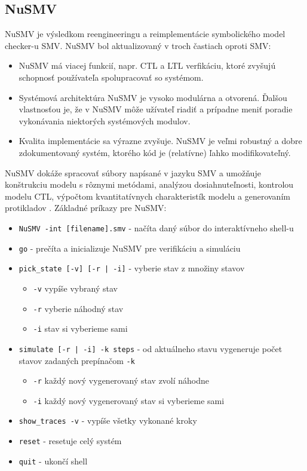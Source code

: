 \subsection{NuSMV}
NuSMV je výsledkom reengineeringu a reimplementácie symbolického model checker-u SMV. NuSMV 
bol aktualizovaný v troch častiach oproti SMV:

\begin{itemize}
    \item NuSMV má viacej funkcií, napr. CTL a LTL verfikáciu, ktoré zvyšujú schopnosť 
    používateľa spolupracovať so systémom.
    \item Systémová architektúra NuSMV je vysoko modulárna a otvorená. Ďalšou vlastnosťou je, 
    že v NuSMV môže užívateľ riadiť a prípadne meniť poradie vykonávania niektorých systémových modulov.
    \item Kvalita implementácie sa výrazne zvyšuje. NuSMV je veľmi robustný a dobre zdokumentovaný systém, 
    ktorého kód je (relatívne) ľahko modifikovateľný.
\end{itemize}

NuSMV dokáže spracovať súbory napísané v jazyku SMV a umožňuje konštrukciu modelu s rôznymi metódami, 
analýzou dosiahnuteľnosti, kontrolou modelu CTL, výpočtom kvantitatívnych charakteristík 
modelu a generovaním protikladov \cite{br8}. Základné príkazy pre NuSMV:

\begin{itemize}
    \item \texttt{NuSMV -int [filename].smv} - načíta daný súbor do interaktívneho shell-u
    \item \texttt{go} - prečíta a inicializuje NuSMV pre verifikáciu a simuláciu
    \item \texttt{pick\_state [-v] [-r | -i]} - vyberie stav z množiny stavov
    \begin{itemize}
        \item[\textbullet] \texttt{-v} vypíše vybraný stav
        \item[\textbullet] \texttt{-r} vyberie náhodný stav
        \item[\textbullet] \texttt{-i} stav si vyberieme sami
    \end{itemize}
    \item \texttt{simulate [-r | -i] -k steps} - od aktuálneho stavu vygeneruje počet stavov zadaných 
    prepínačom \texttt{-k}
    \begin{itemize}
        \item[\textbullet] \texttt{-r} každý nový vygenerovaný stav zvolí náhodne
        \item[\textbullet] \texttt{-i} každý nový vygenerovaný stav si vyberieme sami
    \end{itemize}
    \item \texttt{show\_traces -v} - vypíše všetky vykonané kroky
    \item \texttt{reset} - resetuje celý systém
    \item \texttt{quit} - ukončí shell
\end{itemize}

